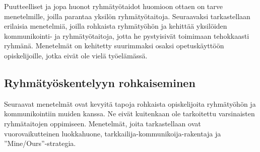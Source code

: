 \documentclass[finnish]{../tktltiki2}
\theoremstyle{definition}
\theoremstyle{remark}
\begin{document}
Puutteelliset ja jopa huonot ryhmätyötaidot huomioon ottaen on tarve menetelmille, joilla parantaa yksilön ryhmätyötaitoja.
Seuraavaksi tarkastellaan erilaisia menetelmiä, joilla
rohkaista ryhmätyöhön ja kehittää yksilöiden kommunikointi- ja ryhmätyötaitoja, jotta he pystyisivät toimimaan tehokkaasti ryhmänä. Menetelmät on
kehitetty suurimmaksi osaksi opetuskäyttöön opiskelijoille,
jotka eivät ole vielä työelämässä.

\subsection{Ryhmätyöskentelyyn rohkaiseminen}

Seuraavat menetelmät ovat kevyitä tapoja rohkaista opiskelijoita
ryhmätyö\-hön ja kommunikointiin muiden kanssa. Ne eivät kuitenkaan
ole tarkoitettu varsinaisten ryhmätaitojen oppimiseen. Menetelmät, joita tarkastellaan
ovat vuorovaikutteinen luokkahuone, tarkkailija-kommunikoija-rakentaja ja ''Mine/Ours''-strategia.
\end{document}
